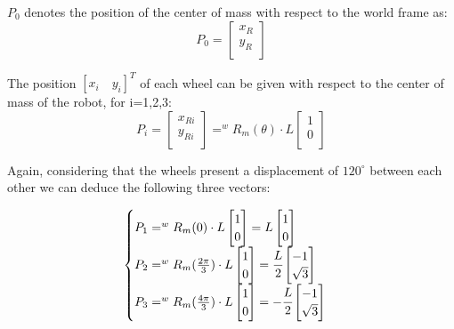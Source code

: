 $P_0$ denotes the position of the center of mass with respect to the world frame as:
\begin{equation}
P_0 = 	\begin{bmatrix}
x_R\\
y_R\\
\end{bmatrix}
\end{equation}

The position $[x_i\quad y_i]^T$ of each wheel can be given with respect to the center of mass of the robot, for i=1,2,3:
\begin{equation}
P_i = 	\begin{bmatrix}
x_{Ri}\\
y_{Ri}\\
\end{bmatrix} = 
^wR_m(\theta)\cdot L
\begin{bmatrix}
1\\
0\\
\end{bmatrix}
\end{equation}

Again, considering that the wheels present a displacement of $120^\circ$ between each other we can deduce the following three vectors:

\begin{equation}
\begin{cases} 
P_1 = 	
^wR_m(0)\cdot L
\begin{bmatrix}
1\\
0\\
\end{bmatrix} =
L
\begin{bmatrix}
1\\
0\\
\end{bmatrix}
\\ 
P_2 = 	
^wR_m(\frac{2\pi}{3})\cdot L
\begin{bmatrix}
1\\
0\\
\end{bmatrix} =
\cfrac{L}{2}
\begin{bmatrix}
-1\\
\sqrt{3}\\
\end{bmatrix}
\\ 
P_3 = 	
^wR_m(\frac{4\pi}{3})\cdot L
\begin{bmatrix}
1\\
0\\
\end{bmatrix} =
-\cfrac{L}{2}
\begin{bmatrix}
-1\\
\sqrt{3}\\
\end{bmatrix}
\\ 
\end{cases} 
\end{equation}

